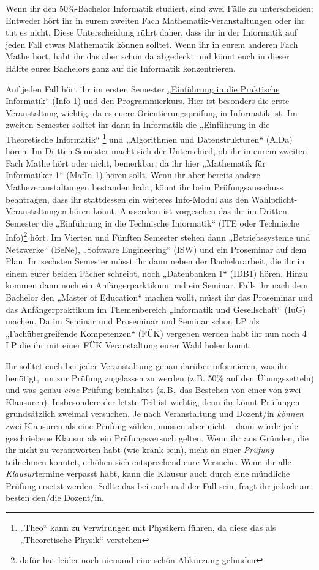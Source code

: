 Wenn ihr den 50\%-Bachelor Informatik studiert, sind zwei Fälle zu
unterscheiden: Entweder hört ihr in eurem zweiten Fach
Mathematik-Veranstaltungen oder ihr tut es nicht. Diese Unterscheidung rührt
daher, dass ihr in der Informatik auf jeden Fall etwas Mathematik können
solltet. Wenn ihr in eurem anderen Fach Mathe hört, habt ihr das aber schon da
abgedeckt und könnt euch in dieser Hälfte eures Bachelors ganz auf die
Informatik konzentrieren.

Auf jeden Fall hört ihr im ersten Semester \hyperref[info1]{„Einführung in die
Praktische Informatik“ (Info 1)} und den Programmierkurs. Hier ist besonders
die erste Veranstaltung wichtig, da es euere Orientierungsprüfung in Informatik
ist. Im zweiten Semester solltet ihr dann in Informatik die „Einführung in die
Theoretische Informatik“ \footnote{„Theo“ kann zu Verwirungen mit Physikern
führen, da diese das als „Theoretische Physik“ verstehen} und „Algorithmen und
Datenstrukturen“ (AlDa) hören. Im Dritten Semester macht sich der Unterschied,
ob ihr in eurem zweiten Fach Mathe hört oder nicht, bemerkbar, da ihr hier
„Mathematik für Informatiker 1“ (MafIn 1)  hören sollt.  Wenn ihr aber bereits
andere Matheveranstaltungen bestanden habt, könnt ihr beim Prüfungsausschuss
beantragen, dass ihr stattdessen ein weiteres Info-Modul aus den
Wahlpflicht-Veranstaltungen hören könnt.  Ausserdem ist vorgesehen das ihr im
Dritten Semester die „Einführung in die Technische Informatik“ (ITE oder
Technische Info)\footnote{dafür hat leider noch niemand eine schön Abkürzung
gefunden} hört.  Im Vierten und Fünften Semester stehen dann „Betriebssysteme
und Netzwerke“ (BeNe), „Software Engineering“ (ISW) und ein Proseminar auf dem
Plan. Im sechsten Semester müsst ihr dann neben der Bachelorarbeit, die ihr in
einem eurer beiden Fächer schreibt, noch „Datenbanken 1“ (IDB1) hören. Hinzu
kommen dann noch ein Anfängerparktikum und ein Seminar. Falls ihr nach dem
Bachelor den „Master of Education“ machen wollt, müsst ihr das Proseminar und
das Anfängerpraktikum im Themenbereich „Informatik und Gesellschaft“ (IuG)
machen.  Da im Seminar und Proseminar und Seminar schon LP als
„Fachübergreifende Kompetenzen“ (FÜK) vergeben werden habt ihr nun noch 4 LP
die ihr mit einer FÜK Veranstaltung eurer Wahl holen könnt.

Ihr solltet euch bei jeder Veranstaltung genau darüber informieren, was ihr
benötigt, um zur Prüfung zugelassen zu werden (z.B. 50\% auf den Übungszetteln)
und was genau \emph{eine} Prüfung beinhaltet (z.\,B.\ das Bestehen von einer von
zwei Klausuren). Insbesondere der letzte Teil ist wichtig, denn ihr könnt
Prüfungen grundsätzlich zweimal versuchen. Je nach Veranstaltung und Dozent/in
\emph{können} zwei Klausuren als eine Prüfung zählen, müssen aber nicht -- dann
würde jede geschriebene Klausur als ein Prüfungsversuch gelten. Wenn ihr aus
Gründen, die ihr nicht zu verantworten habt (wie krank sein), nicht an einer
\emph{Prüfung} teilnehmen konntet, erhöhen sich entsprechend eure Versuche.
Wenn ihr alle \emph{Klausur}termine verpasst habt, kann die Klausur auch durch
eine mündliche Prüfung ersetzt werden. Sollte das bei euch mal der Fall sein,
fragt ihr jedoch am besten den/die Dozent/in.

